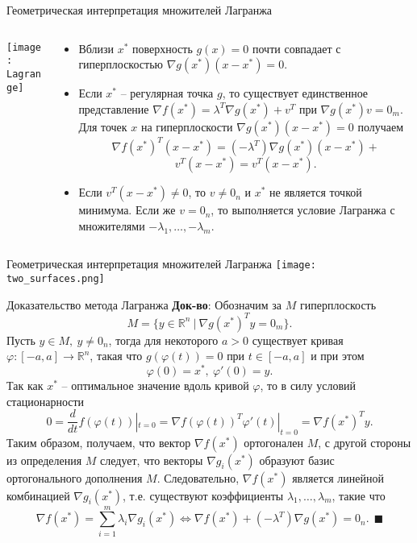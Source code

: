\documentclass[10pt]{beamer}
\begin{document}
\begin{frame}{Геометрическая интерпретация множителей Лагранжа}
\begin{columns}
\begin{column}{.4\textwidth}
\texttt{[image: Lagrange]}
\end{column}

\begin{column}{.6\textwidth}
\begin{itemize}[<+->]
\item Вблизи $x^*$ поверхность $g(x)=0$ почти совпадает с гиперплоскостью $\nabla g(x^*)(x-x^*)=0$. 
\item Если $x^*$ -- регулярная точка $g$, то существует единственное представление $\nabla f(x^*)=\lambda^T\nabla g(x^*)+v^T$ при $\nabla g(x^*)v=0_m$. 
Для точек $x$ на гиперплоскости $\nabla g(x^*)(x-x^*)=0$ получаем
$$
\nabla f(x^*)^T(x-x^*)=(-\lambda^T)\nabla g(x^*)(x-x^*)+
$$
$$
v^T(x-x^*)=v^T(x-x^*).
$$
\item Если $v^T(x-x^*)\neq 0$, то $v\neq 0_n$ и $x^*$ не является точкой минимума. Если же $v=0_n$, то выполняется условие Лагранжа с множителями $-\lambda_1, \ldots, -\lambda_m$.
\end{itemize}
\end{column}
\end{columns}
\end{frame}

\begin{frame}{Геометрическая интерпретация множителей Лагранжа}
\texttt{[image: two\_surfaces.png]}
\end{frame}

\begin{frame}{Доказательство метода Лагранжа}
\textbf{Док-во}: Обозначим за $M$ гиперплоскость
$$
M=\{y\in \mathbb{R}^n~|~\nabla g(x^*)^Ty=0_m\}.
$$
Пусть $y\in M,~y\neq 0_n$, тогда для некоторого $a>0$ существует кривая $\varphi:[-a,a]\rightarrow\mathbb{R}^n$, такая что $g(\varphi(t))=0$ при $t\in[-a, a]$ и при этом
$$
\varphi(0)=x^*,~ \varphi'(0)=y.
$$
Так как $x^*$ -- оптимальное значение вдоль кривой $\varphi$, то в силу условий стационарности
$$
0=\frac{d}{dt}f(\varphi(t))|_{t=0}=\nabla f(\varphi(t))^T \varphi'(t)|_{t=0}=\nabla f(x^*)^Ty.
$$
\pause
Таким образом, получаем, что вектор $\nabla f(x^*)$ ортогонален $M$, с другой стороны из определения $M$ следует, что векторы $\nabla g_i(x^*)$ образуют базис ортогонального дополнения $M$. Следовательно, $\nabla f(x^*)$ является линейной комбинацией $\nabla g_i(x^*)$, т.е. существуют коэффициенты $\lambda_1, \ldots, \lambda_m$, такие что
$$
\nabla f(x^*)=\sum_{i=1}^m\lambda_i\nabla g_i(x^*)\Leftrightarrow 
\nabla f(x^*)+(-\lambda^T)\nabla g(x^*)=0_n. ~~\blacksquare
$$
\end{frame}
\end{document}
